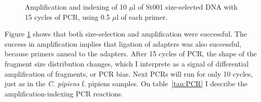 \documentclass[a4paper,12pt,twosided]{article}
\begin{document}
\begin{figure}
\caption{Amplification and indexing of 10 $\mu$l of St001 size-selected DNA with 15 cycles of PCR, using 0.5 $\mu$l of each primer.}\label{fig:PCR}
\end{figure}

Figure \ref{fig:PCR} shows that both size-selection and amplification were successful. The success in amplification implies that ligation of adapters was also successful, because primers anneal to the adapters. After 15 cycles of PCR, the shape of the fragment size distribution changes, which I interprete as a signal of differential amplification of fragments, or PCR bias. Next PCRs will run for only 10 cycles, just as in the \emph{C. pipiens} f. pipiens samples. On table~\ref{tau:PCR} I describe the amplification-indexing PCR reactions.
\end{document}
